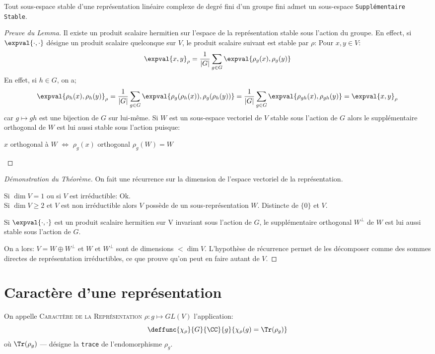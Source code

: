 \begin{lemme}
	Tout sous-espace stable d'une représentation linéaire complexe de degré fini d'un groupe fini admet un sous-espace \texttt{Supplémentaire Stable}.
\end{lemme}
\begin{proof}[Preuve du Lemma]
	Il existe un produit scalaire hermitien sur l'espace de la représentation stable sous l'action du groupe. En effect, si $\expval{\cdot,\cdot}$ désigne un produit scalaire quelconque sur $V$, le produit scalaire suivant est stable par $\rho$:
	Pour $x,y\in V$:
	$$\expval{x,y}_\rho=\frac 1{|G|}\sum_{g\in G}\expval{\rho_g(x),\rho_g(y)}$$
	En effet, si $h\in G$, on a;
	$$\expval{\rho_h(x),\rho_h(y)}_\rho=\frac 1{|G|}\sum_{g\in G}\expval{\rho_g(\rho_h(x)),\rho_g(\rho_h(y))}=\frac 1{|G|}\sum_{g\in G}\expval{\rho_{gh}(x),\rho_{gh}(y)} = \expval{x,y}_\rho$$ car $g\mapsto gh$ est une bijection de $G$ sur lui-même.
	Si $W$ est un sous-espace vectoriel de $V$ stable sous l'action de $G$  alors le supplémentaire orthogonal de $W$ est lui aussi stable sous l'action puisque:
	\begin{flushright}

	$x$ orthogonal à $W$ $\Longleftrightarrow$ $\rho_g(x)$ orthogonal $\rho_g(W)=W$
	\end{flushright}
\end{proof}
\begin{proof}[Démonstration du Théorème]
	On fait une récurrence sur la dimension de l'espace vectoriel de la représentation.

	Si $\dim V=1$ ou si $V$ est irréductible: Ok.\\
	Si $\dim V \geq 2$ et $V$ est non irréductible alors $V$ possède de un sous-représentation $W$. Distincte de $\{0\}$ et $V$.

	Si $\expval{\cdot, \cdot}$ est un produit scalaire hermitien sur V invariant sous l'action de $G$, le supplémentaire orthogonal $W^\perp$ de $W$ est lui aussi stable sous l'action de $G$.
	
	On a lors: $V=W\oplus W^\perp$ et $W$ et $W^\perp$ sont de dimensions $< \dim V$.
	L'hypothèse de récurrence permet de les décomposer comme des sommes directes de représentation irréductibles, ce que prouve qu'on peut en faire autant de $V$.
\end{proof}

\section{Caractère d'une représentation}
\begin{definition}
	On appelle \textsc{Caractère de la Représentation} $\rho:g\mapsto GL(V)$ l'application: 
	$$\deffunc{\chi_\rho}{G}{\CC}{g}{\chi_\rho(g)=\Tr(\rho_g)}$$ 
	où $\Tr(\rho_g)$ --- désigne la \texttt{trace} de l'endomorphisme $\rho_g$.
\end{definition}

